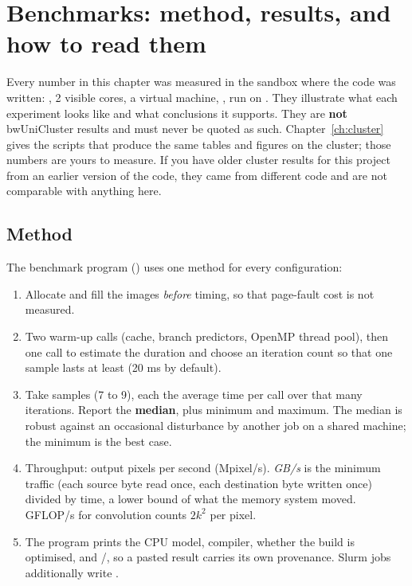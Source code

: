 \chapter{Benchmarks: method, results, and how to read them}\label{ch:bench}

\begin{warn}
Every number in this chapter was measured in the sandbox where the code was written: \sbxCpu, 2 visible cores, a virtual machine, \sbxCompiler, run on \sbxDate. They illustrate what each experiment looks like and what conclusions it supports. They are \textbf{not} bwUniCluster results and must never be quoted as such. Chapter~\ref{ch:cluster} gives the scripts that produce the same tables and figures on the cluster; those numbers are yours to measure. If you have older cluster results for this project from an earlier version of the code, they came from different code and are not comparable with anything here.
\end{warn}

\section{Method}

The benchmark program () uses one method for every configuration:
\begin{enumerate}
\item Allocate and fill the images \emph{before} timing, so that page-fault cost is not measured.
\item Two warm-up calls (cache, branch predictors, OpenMP thread pool), then one call to estimate the duration and choose an iteration count so that one sample lasts at least  (20 ms by default).
\item Take  samples (7 to 9), each the average time per call over that many iterations. Report the \textbf{median}, plus minimum and maximum. The median is robust against an occasional disturbance by another job on a shared machine; the minimum is the best case.
\item Throughput: output pixels per second (Mpixel/s). \emph{GB/s} is the minimum traffic (each source byte read once, each destination byte written once) divided by time, a lower bound of what the memory system moved. GFLOP/s for convolution counts $2k^2$ per pixel.
\item The program prints the CPU model, compiler, whether the build is optimised, and /, so a pasted result carries its own provenance. Slurm jobs additionally write .
\end{enumerate}

